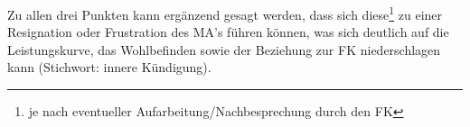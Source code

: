 \pagebreak

Zu allen drei Punkten kann ergänzend gesagt werden, dass sich diese\footnote{je nach eventueller Aufarbeitung/Nachbesprechung durch den \ac{FK} } zu einer Resignation oder Frustration des \ac{MA}'s führen können, was sich deutlich auf die Leistungskurve, das Wohlbefinden sowie der Beziehung zur \ac{FK} niederschlagen kann (Stichwort: innere Kündigung).


